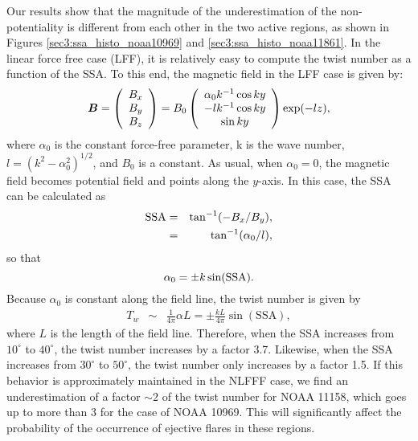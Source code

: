 \documentclass[manuscript]{aastex61}
\def\vector#1{\mbox{\boldmath $#1$}}
\begin{document}
Our results show that the magnitude of the underestimation of the
non-potentiality is different from each other in the two active regions, as
shown in Figures \ref{sec3:ssa_histo_noaa10969} and
\ref{sec3:ssa_histo_noaa11861}. In the linear force free
case (LFF), it is relatively easy to compute the twist number
as a function of the SSA. To this end, the magnetic field 
in the LFF case is given by:
\begin{equation}
\vector{B}=\left(
\begin{array}{c}
B_x\\
B_y\\
B_z
\end{array}
\right)=B_0\left(
\begin{array}{c}
\alpha_0 k^{-1} \cos ky\\
-l k^{-1} \cos ky \\
\sin ky
\end{array}
\right)\exp(-lz),
\end{equation}
where $\alpha_0$ is the constant force-free parameter, k is the wave number,
$l=(k^2-\alpha_0^2)^{1/2}$, and $B_0$ is a constant. As usual, when $\alpha_0=0$, the
magnetic field becomes potential field and points along 
the $y$-axis. In this case, the SSA can be
calculated as
\begin{eqnarray}
 {\rm SSA}&=&\tan^{-1} (-B_x/B_y),\\
 &=&\tan^{-1} (\alpha_0/l),
 \end{eqnarray}
so that
\begin{equation}
\alpha_0=\pm k \sin ({\rm SSA}).
\end{equation}
Because $\alpha_0$ is constant along
the field line, the twist number is given by
\begin{eqnarray}
T_w&\sim& \frac{1}{4\pi} \alpha L = \pm\frac{kL}{4\pi}\sin(\mathrm{SSA}),
\end{eqnarray}
where $L$ is the length of the field line. Therefore, when the SSA 
increases from $10^\circ$ to $40^\circ$, the twist number increases 
by a factor 3.7. Likewise, when the SSA
increases from $30^\circ$ to $50^\circ$, the twist number only increases by a
factor 1.5. If this behavior is approximately maintained in the NLFFF
case, we find an underestimation of a factor $\sim 2$ of the twist number
for NOAA 11158, which goes up to more than 3 for the case of 
NOAA 10969. 
This will significantly affect the probability of the occurrence of ejective flares in these regions.
\end{document}

